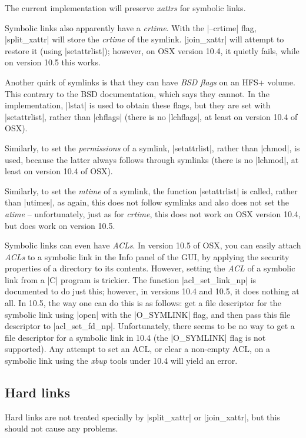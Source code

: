 \documentclass[11pt]{article}
\begin{document}
The current implementation will preserve \emph{xattrs} for symbolic links.  

Symbolic links also apparently have a \emph{crtime}.  
With the |--crtime| flag,
|split_xattr| will store the \emph{crtime} of the symlink.
|join_xattr| will attempt
to restore it (using |setattrlist|);
however,
on OSX version 10.4, it quietly fails, while on version 10.5 this works.

Another quirk of symlinks is that they can have \emph{BSD flags} 
on an HFS+ volume.
This contrary to the BSD documentation, which says they cannot.  In the
implementation, |lstat| is used to obtain these flags, but they are set with
|setattrlist|, rather than |chflags| (there is no |lchflags|, at least 
on version 10.4 of OSX).  

Similarly, to set the \emph{permissions} of a symlink, |setattrlist|,
rather than |chmod|, is used, because the latter always follows through symlinks
(there is no |lchmod|, at least on version 10.4 of OSX).  

Similarly, to set the \emph{mtime} of a symlink, 
the function |setattrlist| is called,
rather than |utimes|, as again, this does not follow symlinks and also
does not set the \emph{atime} -- unfortunately, just as for \emph{crtime}, this
does not work on OSX version 10.4, but does work on version 10.5.

Symbolic links can even have \emph{ACLs}.
In version 10.5 of OSX, you can easily attach \emph{ACLs} to
a symbolic link in the Info panel of the GUI, by applying the
security properties of a directory to its contents.
However, setting the \emph{ACL} of a symbolic link from a |C|
program is trickier.
The function |acl_set_link_np| is documented to do just this;
however, in versions 10.4 and 10.5, it does nothing at all.
In 10.5, the way one can do this is as follows:
get a file descriptor for the symbolic link using |open| with
the |O_SYMLINK| flag, and then pass this file descriptor to
|acl_set_fd_np|.
Unfortunately, there seems to be no way to get a file descriptor
for a symbolic link in 10.4 (the |O_SYMLINK| flag is not supported).
Any attempt to set an ACL, or clear a non-empty ACL,  
on a symbolic link using the \emph{xbup}
tools under 10.4 will yield an error.


\subsection{Hard links}

Hard links are not treated specially by |split_xattr| or 
|join_xattr|,
but this should not cause any problems.
\end{document}
